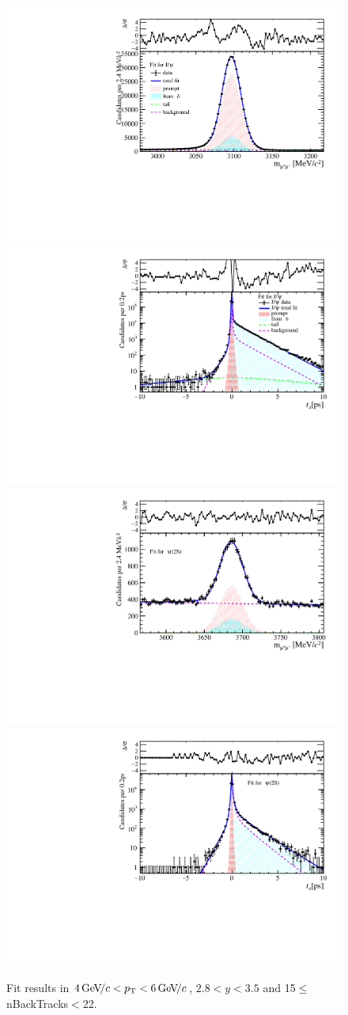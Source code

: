 \begin{figure}[H]
\begin{center}
\includegraphics[width=0.47\linewidth]{pdf/Jpsi/drawmassB/n3y2pt3.pdf}
\includegraphics[width=0.47\linewidth]{pdf/Jpsi/2DFitB/n3y2pt3.pdf}
\vspace*{-0.5cm}
\includegraphics[width=0.47\linewidth]{pdf/Psi2S/drawmassB/n3y2pt3.pdf}
\includegraphics[width=0.47\linewidth]{pdf/Psi2S/2DFitB/n3y2pt3.pdf}
\vspace*{-0.5cm}
\end{center}
\caption{Fit results in $4\text{\,Ge\kern -0.1em V\!/}c<p_{\mathrm{T}}<6\text{\,Ge\kern -0.1em V\!/}c$, $2.8<y<3.5$ and 15$\leq$nBackTracks$<$22.}
\label{Fitn3y2pt3}
\end{figure}
